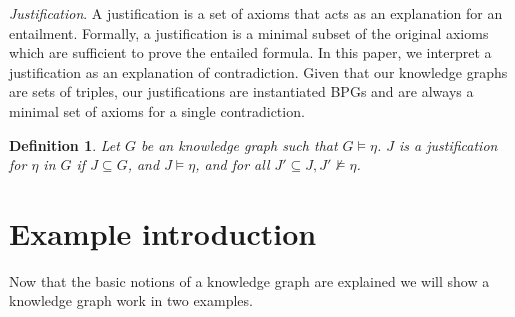 \documentclass[11pt,letterpaper ,oneside ]{book}
\newtheorem{definition}{Definition}
\begin{document}
	\textit{Justification}. A justification\cite{Horridge:2009} is a set of axioms that acts as an explanation for an entailment.
	Formally, a justification is a minimal subset of the original axioms which are sufficient to prove the entailed formula. In this paper, we interpret a justification as an explanation of contradiction. Given that our knowledge graphs are sets of triples, our justifications are instantiated BPGs and are always a minimal set of axioms for a single contradiction. \\
	
\begin{definition} 
	Let $G$ be an knowledge graph such that $G \models \eta$. $J$ is a justification for $\eta$ in $G$ if $J \subseteq G$, and $J \models \eta$, and for all $J'\subseteq J, J' \not\models \eta$.  \cite{Horridge:2009}
\end{definition}
	
	\section{Example introduction}
	Now that the basic notions of a knowledge graph are explained we will show a knowledge graph work in two examples. 
			\begin{figure}[!t]
\end{figure}
\end{document}
